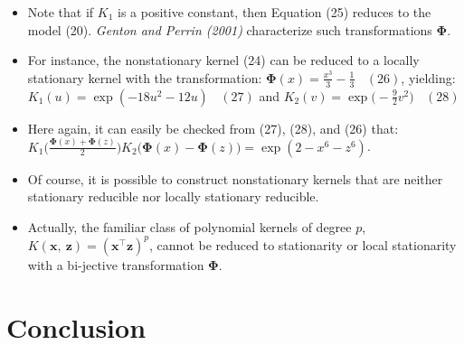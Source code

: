 \documentclass[
  ignorenonframetext,
]{beamer}
\begin{document}
\begin{frame}{}
\protect\hypertarget{section-19}{}
\begin{itemize}
\item
  Note that if \(K_1\) is a positive constant, then Equation (25)
  reduces to the model (20). \emph{Genton and Perrin (2001)}
  characterize such transformations \(\pmb \Phi\).
\item
  For instance, the nonstationary kernel (24) can be reduced to a
  locally stationary kernel with the transformation:
  \(\pmb\Phi(x) = \frac {x^3} 3 - \frac 1 3 \ \ \ \ (26)\), yielding:
  \(K_1(u) = \exp(-18u^2 - 12u) \ \ \ \ (27)\) and
  \(K_2(v) = \exp \big(-\frac 9 2 v^2\big) \ \ \ \ (28)\)
\end{itemize}
\end{frame}

\begin{frame}{}
\protect\hypertarget{section-20}{}
\begin{itemize}
\item
  Here again, it can easily be checked from (27), (28), and (26) that:
  \(K_1\Big(\frac {\pmb\Phi(x) + \pmb\Phi(z)} 2 \Big)K_2\big(\pmb\Phi(x)-\pmb\Phi(z)\big)=\exp(2-x^6-z^6)\).
\item
  Of course, it is possible to construct nonstationary kernels that are
  neither stationary reducible nor locally stationary reducible.
\item
  Actually, the familiar class of polynomial kernels of degree \(p\),
  \(K(\pmb x,\ \pmb z) = (\pmb x^{\top}\pmb z)^p\), cannot be reduced to
  stationarity or local stationarity with a bi-jective transformation
  \(\pmb \Phi\).
\end{itemize}
\end{frame}

\hypertarget{conclusion}{%
\section{Conclusion}\label{conclusion}}
\end{document}
